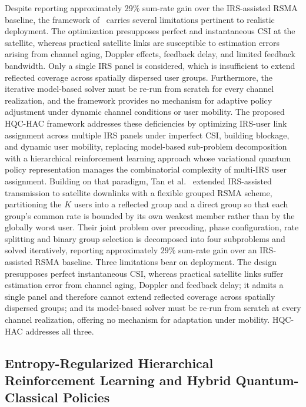 \documentclass[12pt,onecolumn]{IEEEtran}
\begin{document}
Despite reporting approximately 29\% sum-rate gain over the IRS-assisted RSMA baseline, the framework of~\cite{tan2025flexible} carries several limitations pertinent to realistic deployment.
The optimization presupposes perfect and instantaneous CSI at the satellite, whereas practical satellite links are susceptible to estimation errors arising from channel aging, Doppler effects, feedback delay, and limited feedback bandwidth.
Only a single IRS panel is considered, which is insufficient to extend reflected coverage across spatially dispersed user groups.
Furthermore, the iterative model-based solver must be re-run from scratch for every channel realization, and the framework provides no mechanism for adaptive policy adjustment under dynamic channel conditions or user mobility.
The proposed HQC-HAC framework addresses these deficiencies by optimizing IRS-user link assignment across multiple IRS panels under imperfect CSI, building blockage, and dynamic user mobility, replacing model-based sub-problem decomposition with a hierarchical reinforcement learning approach whose variational quantum policy representation manages the combinatorial complexity of multi-IRS user assignment.
\else
Building on that paradigm, Tan et al.~\cite{tan2025flexible} extended IRS-assisted
transmission to satellite downlinks with a flexible grouped RSMA scheme, partitioning the
$K$ users into a reflected group and a direct group so that each group's common rate is
bounded by its own weakest member rather than by the globally worst user. Their joint
problem over precoding, phase configuration, rate splitting and binary group selection is
decomposed into four subproblems and solved iteratively, reporting approximately $29\%$
sum-rate gain over an IRS-assisted RSMA baseline. Three limitations bear on deployment.
The design presupposes perfect instantaneous CSI, whereas practical satellite links suffer
estimation error from channel aging, Doppler and feedback delay; it admits a single panel
and therefore cannot extend reflected coverage across spatially dispersed groups; and its
model-based solver must be re-run from scratch at every channel realization, offering no
mechanism for adaptation under mobility. HQC-HAC addresses all three.
\fi

\subsection{Entropy-Regularized Hierarchical Reinforcement Learning and Hybrid Quantum-Classical Policies}
\end{document}
